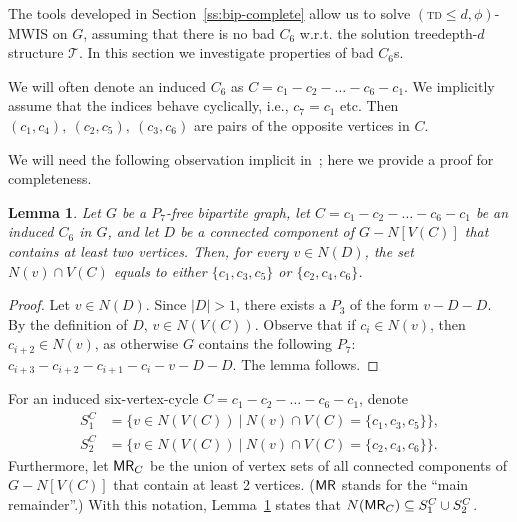 \documentclass[11pt,a4paper]{article}
\newtheorem{lemma}[theorem]{Lemma}
\theoremstyle{definition}
\def\T{\mathcal{T}}
\begin{document}
The tools developed in Section~\ref{ss:bip-complete} allow us to solve \textsc{$(\mathrm{td} \leq d, \phi)$-MWIS} on $G$, assuming
that there is no bad $C_6$ w.r.t. the solution treedepth-$d$ structure $\T$. In this section we investigate properties of bad $C_6$s.

We will often denote an induced $C_6$ as $C = c_1-c_2-\ldots-c_6-c_1$. We implicitly assume that
the indices behave cyclically, i.e., $c_7=c_1$ etc.
Then $(c_1, c_4),\ (c_2, c_5),\ (c_3, c_6)$ are pairs of the opposite vertices in $C$. 

We will need the following observation implicit in~\cite{Bonomo-Braberman21}; here we provide a proof for completeness.
\begin{lemma}\label{lem:bip-C6-bigrest}
Let $G$ be a $P_7$-free bipartite graph, let $C=c_1-c_2-\ldots-c_6-c_1$ be an induced $C_6$ in $G$,
and let $D$ be a connected component of $G-N[V(C)]$ that contains at least two vertices.
Then, for every $v \in N(D)$, the set $N(v) \cap V(C)$ equals to either $\{c_1,c_3,c_5\}$ or $\{c_2,c_4,c_6\}$.
\end{lemma}
\begin{proof}
    Let $v \in N(D)$. Since $|D| > 1$, there exists a $P_3$ of the form $v-D-D$. 
    By the definition of $D$, $v \in N(V(C))$.
    Observe that if $c_i \in N(v)$, then $c_{i+2} \in N(v)$, as otherwise $G$ contains the following $P_7$: $c_{i+3}-c_{i+2}-c_{i+1}-c_i-v-D-D$. 
    The lemma follows.
\end{proof}
For an induced six-vertex-cycle $C=c_1-c_2-\ldots-c_6-c_1$, denote 
\begin{align*}
    S_1^C &= \{v \in N(V(C))~|~N(v) \cap V(C) = \{c_1,c_3,c_5\}\}, \\
    S_2^C &= \{v \in N(V(C))~|~N(v) \cap V(C) = \{c_2,c_4,c_6\}\}.
\end{align*}
Furthermore, let $\mathsf{MR}_C$ be the union of vertex sets of all connected components of $G-N[V(C)]$ that contain
at least 2 vertices. ($\mathsf{MR}$ stands for the ``main remainder''.)
With this notation, Lemma~\ref{lem:bip-C6-bigrest} states that $N(\mathsf{MR}_C) \subseteq S_1^C \cup S_2^C$. 
\end{document}
